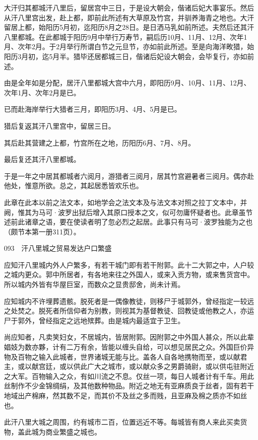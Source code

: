 \documentclass[12pt,UTF8]{ctexbook}
\begin{document}
大汗归其都城汗八里后，留居宫中三日，于是设大朝会，偕诸后妃大事宴乐。然后从汗八里宫出发，赴上都，即前此所述有大草原及竹宫，并驯养海青之地也。大汗留居上都，始阳历5月初，迄阳历8月之28日。是日洒马乳如前所述。夫然后还其汗八里都城。在此都城于阳历9月中举行万寿节，嗣后历10月、11月、12月、次年1月、次年2月。于2月举行所谓白节之元旦节，亦如前此所述。至是向海洋畋猎，始阳历3月初，迄5月半。猎毕还居都城三日，偕诸后妃设大朝会，会毕复行，亦如前述。

由是全年如是分配，居汗八里都城大宫中六月，即阳历9月、10月、11月、12月、次年1月、次年2月是已。

已而赴海岸举行大猎者三月，即阳历3月、4月、5月是已。

猎后复返其汗八里宫中，留居三日。

其后赴其营建之上都，竹宫所在之地，历阳历6月、7月、8月。

最后复还其汗八里都城。

于是一年之中居其都城者六阅月，游猎者三阅月，居其竹宫避暑者三阅月。偶亦赴他处，惟意所欲。总之，其起居悉皆欢乐也。

此章在此本以前之法文本，如地学会之法文本及与法文本对照之拉丁文本中，并阙，惟其为马可·波罗出狱后增入其原口授本之文，似可勿庸怀疑者也。此章虽节述前此诸章之语，要在使读者明了忽必烈之起居。此事只有马可·波罗独能为之也（颇节本第一册311页）。





093　汗八里城之贸易发达户口繁盛

应知汗八里城内外人户繁多，有若干城门即有若干附郭。此十二大郭之中，人户较之城内更众。郭中所居者，有各地来往之外国人，或来入贡方物，或来售货宫中。所以城内外皆有华屋巨室，而数众之显贵邸舍，尚未计焉。

应知城内不许埋葬遗骸。脱死者是一偶像教徒，则移尸于城郭外，曾经指定一较远之处焚之。脱死者所信仰者为别教，则视其为基督教徒、回教徒或他教之人，亦运尸于郭外，曾经指定之远地殡葬。由是城内最适宜于卫生。

尚应知者，凡卖笑妇女，不居城内，皆居附郭。因附郭之中外国人甚众，所以此辈娼妓为数亦夥，计有二万有余，皆能以缠头自给，可以想见居民之众。外国巨价异物及百物之输入此城者，世界诸城无能与比。盖各人自各地携物而至，或以献君主，或以献宫廷，或以供此广大之城市，或以献众多之男爵骑尉，或以供屯驻附近之大军。百物输入之众，有如川流之不息。仅丝一项，每日人城者计有千车。用此丝制作不少金锦绸绢，及其他数种物品。附近之地无有亚麻质良于丝者，固有若干地域出产棉麻，然其数不足，而其价不及丝之多而贱，且亚麻及棉之质亦不如丝也。

此汗八里大城之周围，约有城市二百，位置远近不等。每城皆有商人来此买卖货物，盖此城为商业繁盛之城也。
\end{document}
